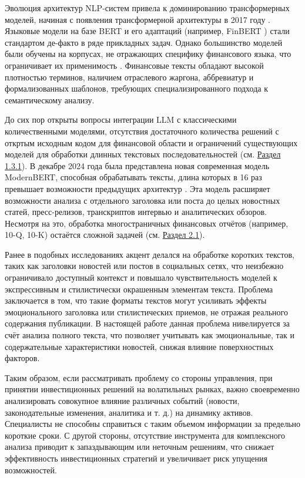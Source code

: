 Эволюция архитектур NLP-систем привела к доминированию трансформерных моделей, начиная с появления трансформерной
архитектуры в 2017 году \parencite{vaswani2017attention}. Языковые модели на базе BERT \parencite{devlin2019BERT}
и его адаптаций (например, FinBERT \parencite{Liu2020FinBERT,Yang2020FinBERT,Huang2023FinBERT,Araci2019FinBERT})
стали стандартом де-факто в ряде прикладных задач. Однако большинство моделей были обучены на корпусах,
не отражающих специфику финансового языка, что ограничивает их применимость \parencite{Jiang2023, devlin2019BERT}.
Финансовые тексты обладают высокой плотностью терминов, наличием отраслевого жаргона, аббревиатур
и формализованных шаблонов, требующих специализированного подхода к семантическому анализу.

До сих пор открыты вопросы интеграции LLM с классическими количественными моделями, отсутствия
достаточного количества решений с откртым исходным кодом для финансовой области и ограничений
существующих моделей для обработки длинных текстовых последовательностей (см. \hyperref[sec:models]{Раздел 1.3.1}).
В декабре 2024 года была представлена новая современная модель ModernBERT, способная обрабатывать тексты, длина которых
в 16 раз превышает возможности предыдущих архитектур \parencite{Warner2024ModernBERT, devlin2019BERT}. Эта модель
расширяет возможности анализа с отдельного заголовка или поста до целых новостных статей, пресс-релизов, транскриптов
интервью и аналитических обзоров. Несмотря на это, обработка многостраничных финансовых отчётов (например, 10-Q, 10-K)
остаётся сложной задачей (см. \hyperref[sec:limitations]{Раздел 2.1}).

Ранее в подобных исследованиях акцент делался на обработке коротких текстов, таких как заголовки
новостей или постов в социальных сетях, что неизбежно ограничивало доступный контекст и повышало чувствительность
моделей к экспрессивным и стилистически окрашенным элементам текста. Проблема заключается в том,
что такие форматы текстов могут усиливать эффекты эмоционального заголовка или стилистических
приемов, не отражая реального содержания публикации. В настоящей работе данная проблема
нивелируется за счёт анализа полного текста, что позволяет учитывать как эмоциональные,
так и содержательные характеристики новостей, снижая влияние поверхностных факторов.

Таким образом, если рассматривать проблему со стороны управления, при принятии инвестиционных решений на волатильных рынках,
важно своевременно анализировать совокупное влияние различных событий (новости, законодательные изменения, аналитика и т. д.)
на динамику активов. Специалисты не способны справиться с таким объемом информации за предельно короткие сроки. С другой
стороны, отсутствие инструмента для комплексного анализа приводит к запаздывающим или неточным решениям, что снижает
эффективность инвестиционных стратегий и увеличивает риск упущения возможностей.


